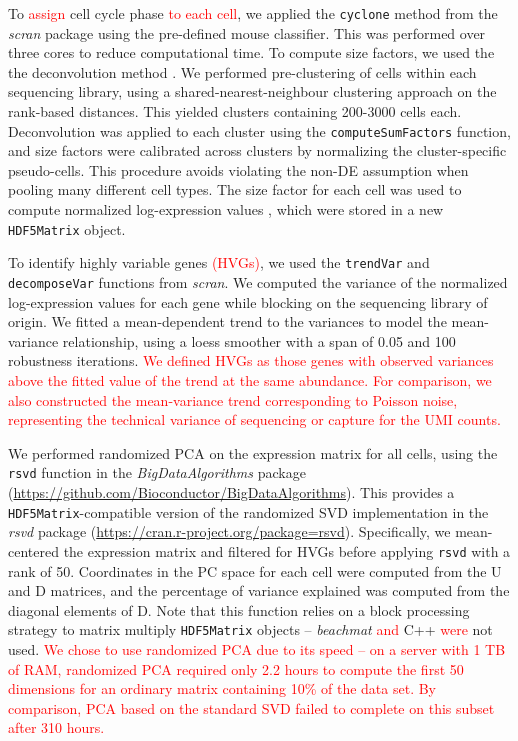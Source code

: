 \documentclass{article}
\newcommand{\beachmat}{\textit{beachmat}}
\newcommand{\code}[1]{\texttt{#1}}
\newcommand{\revised}[1]{\textcolor{red}{#1}}
\begin{document}
To \revised{assign} cell cycle phase \revised{to each cell}, we applied the \code{cyclone} method \cite{scialdone2015computational} from the \textit{scran} package using the pre-defined mouse classifier.
This was performed over three cores to reduce computational time.
To compute size factors, we used the the deconvolution method \cite{lun2016pooling}.
We performed pre-clustering of cells within each sequencing library, using a shared-nearest-neighbour clustering approach \cite{xu2015identification} on the rank-based distances.
This yielded clusters containing 200-3000 cells each.
Deconvolution was applied to each cluster using the \code{computeSumFactors} function, and size factors were calibrated across clusters by normalizing the cluster-specific pseudo-cells.
This procedure avoids violating the non-DE assumption when pooling many different cell types.
The size factor for each cell was used to compute normalized log-expression values \cite{lun2016stepbystep}, which were stored in a new \code{HDF5Matrix} object.

To identify highly variable genes \revised{(HVGs)}, we used the \code{trendVar} and \code{decomposeVar} functions from \textit{scran}.
We computed the variance of the normalized log-expression values for each gene while blocking on the sequencing library of origin.
We fitted a mean-dependent trend to the variances to model the mean-variance relationship, using a loess smoother with a span of 0.05 and 100 robustness iterations.
\revised{We defined HVGs as those genes with observed variances above the fitted value of the trend at the same abundance.
For comparison, we also constructed the mean-variance trend corresponding to Poisson noise, representing the technical variance of sequencing \cite{marioni2008rnaseq} or capture for the UMI counts.}

We performed randomized PCA \cite{halko2011finding} on the expression matrix for all cells,
using the \code{rsvd} function in the \textit{BigDataAlgorithms} package (\url{https://github.com/Bioconductor/BigDataAlgorithms}).
This provides a \code{HDF5Matrix}-compatible version of the randomized SVD implementation in the \textit{rsvd} package (\url{https://cran.r-project.org/package=rsvd}).
Specifically, we mean-centered the expression matrix and filtered for HVGs before applying \code{rsvd} with a rank of 50.
Coordinates in the PC space for each cell were computed from the U and D matrices, and the percentage of variance explained was computed from the diagonal elements of D.
Note that this function relies on a block processing strategy to matrix multiply \code{HDF5Matrix} objects -- \beachmat{} \revised{and} C++ \revised{were} not used.
\revised{We chose to use randomized PCA due to its speed -- on a server with 1 TB of RAM,
randomized PCA required only 2.2 hours to compute the first 50 dimensions for an ordinary matrix containing 10\% of the data set.
By comparison, PCA based on the standard SVD failed to complete on this subset after 310 hours.}
\end{document}
